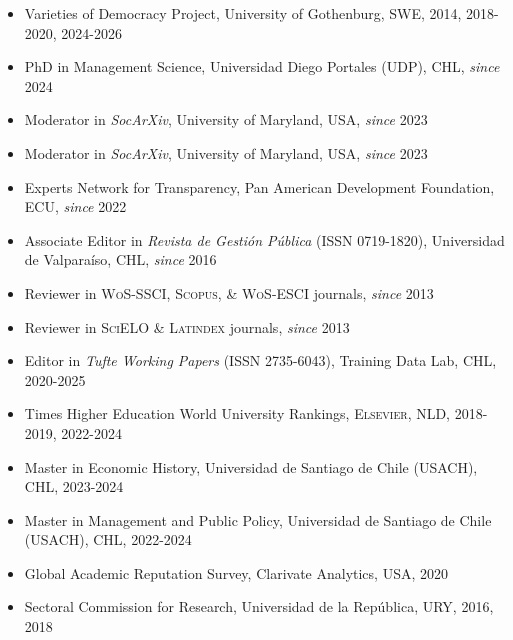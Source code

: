 \begin{publications}


\begin{itemize}
\item{\small Varieties of Democracy Project, University of Gothenburg, SWE, 2014, 2018-2020, 2024-2026}
\item{\small PhD in Management Science, Universidad Diego Portales (UDP), CHL, {\itshape since} 2024}
\item{\small Moderator in {\itshape SocArXiv}, University of Maryland, USA, {\itshape since} 2023}
\item{\small Moderator in {\itshape SocArXiv}, University of Maryland, USA, {\itshape since} 2023}
\item{\small Experts Network for Transparency, Pan American Development Foundation, ECU, {\itshape since} 2022}
\item{\small Associate Editor in {\itshape Revista de Gestión Pública} (ISSN 0719-1820), Universidad de Valparaíso, CHL, {\itshape since} 2016}
\item{\small Reviewer in {\scshape WoS-SSCI}, {\scshape Scopus}, \& {\scshape WoS-ESCI} journals, {\itshape since} 2013}
\item{\small Reviewer in {\scshape SciELO} \& {\scshape Latindex} journals, {\itshape since} 2013}
\item{\small Editor in {\itshape Tufte Working Papers} (ISSN 2735-6043), Training Data Lab, CHL, 2020-2025}
\item{\small Times Higher Education World University Rankings, {\scshape Elsevier}, NLD, 2018-2019, 2022-2024}
\item{\small Master in Economic History, Universidad de Santiago de Chile (USACH), CHL, 2023-2024}
\item{\small Master in Management and Public Policy, Universidad de Santiago de Chile (USACH), CHL, 2022-2024}
\item{\small Global Academic Reputation Survey, Clarivate Analytics, USA, 2020}
\item{\small Sectoral Commission for Research, Universidad de la República, URY, 2016, 2018}
\end{itemize}

\vspace{1mm}
\end{publications}
